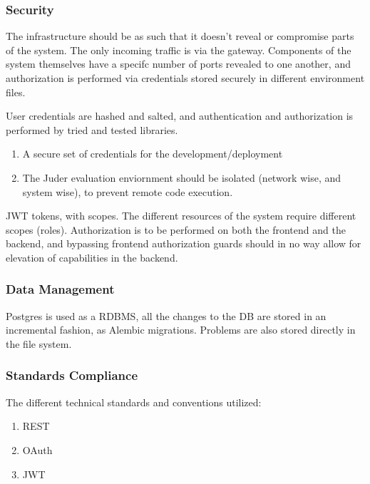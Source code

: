 \subsubsection{Security}

The infrastructure should be as such that it doesn't reveal or compromise parts of the system. The only
incoming traffic is via the gateway. Components of the system themselves have a specifc number of ports revealed
to one another, and authorization is performed via credentials stored securely in different environment files.

User credentials are hashed and salted, and authentication and authorization is performed by tried and tested libraries.


\begin{enumerate}
    \item A secure set of credentials for the development/deployment
    \item The Juder evaluation enviornment should be isolated (network wise, and system wise), to prevent remote code execution.
\end{enumerate}


JWT tokens, with scopes. The different resources of the system require different scopes (roles). Authorization is to be performed on both the 
frontend and the backend, and bypassing frontend authorization guards should in no way allow for elevation of capabilities in the backend.

\subsubsection{Data Management}
Postgres is used as a RDBMS, all the changes to the DB are stored in an incremental fashion, as Alembic migrations.
Problems are also stored directly in the file system.

\subsubsection{Standards Compliance}
The different technical standards and conventions utilized:
\begin{enumerate}
    \item REST
    \item OAuth
    \item JWT
\end{enumerate}

